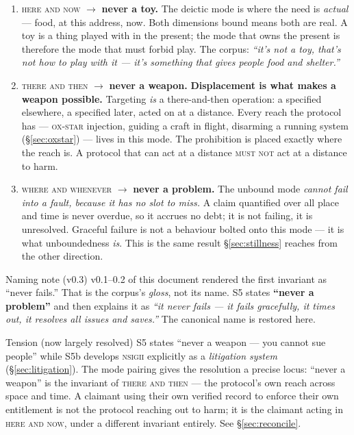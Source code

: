 \documentclass[11pt,a4paper]{article}
\newcommand{\MUSTNOT}{\textsc{must not}}
\newcommand{\NSIGII}{\textsc{nsigii}}
\begin{document}
\begin{enumerate}[leftmargin=*]
  \item \textsc{here and now} $\rightarrow$ \textbf{never a toy.} The deictic
    mode is where the need is \emph{actual} --- food, at this address, now. Both
    dimensions bound means both are real. A toy is a thing played with in the
    present; the mode that owns the present is therefore the mode that must
    forbid play. The corpus: \emph{``it's not a toy, that's not how to play with
    it --- it's something that gives people food and shelter.''}
  \item \textsc{there and then} $\rightarrow$ \textbf{never a weapon.}
    \textbf{Displacement is what makes a weapon possible.} Targeting \emph{is} a
    there-and-then operation: a specified elsewhere, a specified later, acted on
    at a distance. Every reach the protocol has --- \textsc{ox-star} injection,
    guiding a craft in flight, disarming a running system
    (\S\ref{sec:oxstar}) --- lives in this mode. The prohibition is placed
    exactly where the reach is. A protocol that can act at a distance \MUSTNOT{}
    act at a distance to harm.
  \item \textsc{where and whenever} $\rightarrow$ \textbf{never a problem.} The
    unbound mode \emph{cannot fail into a fault, because it has no slot to
    miss.} A claim quantified over all place and time is never overdue, so it
    accrues no debt; it is not failing, it is unresolved. Graceful failure is not
    a behaviour bolted onto this mode --- it is what unboundedness \emph{is}.
    This is the same result \S\ref{sec:stillness} reaches from the other
    direction.
\end{enumerate}

\begin{errata}{Naming note (v0.3)}
v0.1--0.2 of this document rendered the first invariant as ``never fails.'' That
is the corpus's \emph{gloss}, not its name. S5 states \textbf{``never a
problem''} and then explains it as \emph{``it never fails --- it fails
gracefully, it times out, it resolves all issues and saves.''} The canonical name
is restored here.
\end{errata}

\begin{errata}{Tension (now largely resolved)}
S5 states ``never a weapon --- you cannot sue people'' while S5b develops
\NSIGII{} explicitly as a \emph{litigation system} (\S\ref{sec:litigation}). The
mode pairing gives the resolution a precise locus: ``never a weapon'' is the
invariant of \textsc{there and then} --- the protocol's own reach across space
and time. A claimant using their own verified record to enforce their own
entitlement is not the protocol reaching out to harm; it is the claimant acting
in \textsc{here and now}, under a different invariant entirely. See
\S\ref{sec:reconcile}.
\end{errata}
\end{document}
